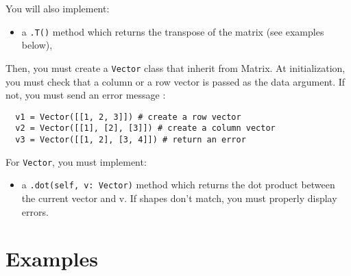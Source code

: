 You will also implement: 
\begin{itemize}
  \item a \texttt{.T()} method which returns the transpose of the matrix (see examples below),
\end{itemize}


Then, you must create a \texttt{Vector} class that inherit from Matrix.
At initialization, you must check that a column or a row vector is passed as the data argument.
If not, you must send an error message :

\begin{verbatim}
  v1 = Vector([[1, 2, 3]]) # create a row vector
  v2 = Vector([[1], [2], [3]]) # create a column vector
  v3 = Vector([[1, 2], [3, 4]]) # return an error
\end{verbatim}

\par
For \texttt{Vector}, you must implement:
\begin{itemize}
  \item a \texttt{.dot(self, v: Vector)} method which returns the dot product between the current vector and v. If shapes don't match, you must properly display errors.
\end{itemize}


\section*{Examples}

